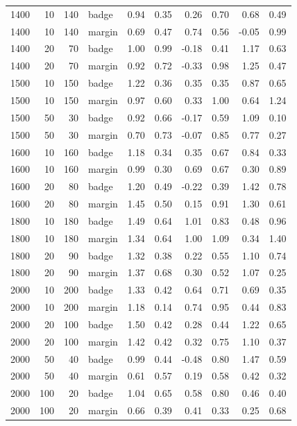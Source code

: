 \begin{tabular}{rrrlrrrrrr}
1400 & 10 & 140 & badge & 0.94 & 0.35 & 0.26 & 0.70 & 0.68 & 0.49 \\
1400 & 10 & 140 & margin & 0.69 & 0.47 & 0.74 & 0.56 & -0.05 & 0.99 \\
1400 & 20 & 70 & badge & 1.00 & 0.99 & -0.18 & 0.41 & 1.17 & 0.63 \\
1400 & 20 & 70 & margin & 0.92 & 0.72 & -0.33 & 0.98 & 1.25 & 0.47 \\
1500 & 10 & 150 & badge & 1.22 & 0.36 & 0.35 & 0.35 & 0.87 & 0.65 \\
1500 & 10 & 150 & margin & 0.97 & 0.60 & 0.33 & 1.00 & 0.64 & 1.24 \\
1500 & 50 & 30 & badge & 0.92 & 0.66 & -0.17 & 0.59 & 1.09 & 0.10 \\
1500 & 50 & 30 & margin & 0.70 & 0.73 & -0.07 & 0.85 & 0.77 & 0.27 \\
1600 & 10 & 160 & badge & 1.18 & 0.34 & 0.35 & 0.67 & 0.84 & 0.33 \\
1600 & 10 & 160 & margin & 0.99 & 0.30 & 0.69 & 0.67 & 0.30 & 0.89 \\
1600 & 20 & 80 & badge & 1.20 & 0.49 & -0.22 & 0.39 & 1.42 & 0.78 \\
1600 & 20 & 80 & margin & 1.45 & 0.50 & 0.15 & 0.91 & 1.30 & 0.61 \\
1800 & 10 & 180 & badge & 1.49 & 0.64 & 1.01 & 0.83 & 0.48 & 0.96 \\
1800 & 10 & 180 & margin & 1.34 & 0.64 & 1.00 & 1.09 & 0.34 & 1.40 \\
1800 & 20 & 90 & badge & 1.32 & 0.38 & 0.22 & 0.55 & 1.10 & 0.74 \\
1800 & 20 & 90 & margin & 1.37 & 0.68 & 0.30 & 0.52 & 1.07 & 0.25 \\
2000 & 10 & 200 & badge & 1.33 & 0.42 & 0.64 & 0.71 & 0.69 & 0.35 \\
2000 & 10 & 200 & margin & 1.18 & 0.14 & 0.74 & 0.95 & 0.44 & 0.83 \\
2000 & 20 & 100 & badge & 1.50 & 0.42 & 0.28 & 0.44 & 1.22 & 0.65 \\
2000 & 20 & 100 & margin & 1.42 & 0.42 & 0.32 & 0.75 & 1.10 & 0.37 \\
2000 & 50 & 40 & badge & 0.99 & 0.44 & -0.48 & 0.80 & 1.47 & 0.59 \\
2000 & 50 & 40 & margin & 0.61 & 0.57 & 0.19 & 0.58 & 0.42 & 0.32 \\
2000 & 100 & 20 & badge & 1.04 & 0.65 & 0.58 & 0.80 & 0.46 & 0.40 \\
2000 & 100 & 20 & margin & 0.66 & 0.39 & 0.41 & 0.33 & 0.25 & 0.68 \\

\end{tabular}
